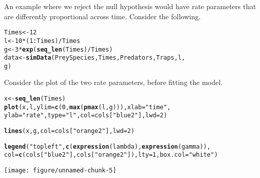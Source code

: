 \documentclass[12pt]{article}\usepackage[]{graphicx}\usepackage[]{color}
\makeatletter
\def\maxwidth{ %
  \ifdim\Gin@nat@width>\linewidth
    \linewidth
  \else
    \Gin@nat@width
  \fi
}
\newcommand{\hlnum}[1]{\textcolor[rgb]{0.686,0.059,0.569}{#1}}%
\newcommand{\hlstr}[1]{\textcolor[rgb]{0.192,0.494,0.8}{#1}}%
\newcommand{\hlopt}[1]{\textcolor[rgb]{0,0,0}{#1}}%
\newcommand{\hlstd}[1]{\textcolor[rgb]{0.345,0.345,0.345}{#1}}%
\newcommand{\hlkwb}[1]{\textcolor[rgb]{0.69,0.353,0.396}{#1}}%
\newcommand{\hlkwc}[1]{\textcolor[rgb]{0.333,0.667,0.333}{#1}}%
\newcommand{\hlkwd}[1]{\textcolor[rgb]{0.737,0.353,0.396}{\textbf{#1}}}%
\newenvironment{kframe}{%
 \def\at@end@of@kframe{}%
 \ifinner\ifhmode%
  \def\at@end@of@kframe{\end{minipage}}%
  \begin{minipage}{\columnwidth}%
 \fi\fi%
 \def\FrameCommand##1{\hskip\@totalleftmargin \hskip-\fboxsep
 \colorbox{shadecolor}{##1}\hskip-\fboxsep
     \hskip-\linewidth \hskip-\@totalleftmargin \hskip\columnwidth}%
 \MakeFramed {\advance\hsize-\width
   \@totalleftmargin\z@ \linewidth\hsize
   \@setminipage}}%
 {\par\unskip\endMakeFramed%
 \at@end@of@kframe}
\newenvironment{knitrout}{}{} %
\makeatother
\begin{document}
An example where we reject the null hypothesis would have rate parameters that are differently proportional across time.  Consider the following.

\begin{knitrout}
\color{fgcolor}\begin{kframe}
\begin{alltt}
\hlstd{Times} \hlkwb{<-} \hlnum{12}
\hlstd{l} \hlkwb{<-} \hlnum{10} \hlopt{*} \hlstd{(}\hlnum{1}\hlopt{:}\hlstd{Times)}\hlopt{/}\hlstd{Times}
\hlstd{g} \hlkwb{<-} \hlnum{3} \hlopt{*} \hlkwd{exp}\hlstd{(}\hlkwd{seq_len}\hlstd{(Times)}\hlopt{/}\hlstd{Times)}
\hlstd{data} \hlkwb{<-} \hlkwd{simData}\hlstd{(PreySpecies, Times, Predators, Traps, l,}
    \hlstd{g)}
\end{alltt}


{\ttfamily\noindent\bfseries{}}\end{kframe}
\end{knitrout}


Consider the plot of the two rate parameters, before fitting the model.  
\begin{knitrout}
\color{fgcolor}\begin{kframe}
\begin{alltt}
\hlstd{x} \hlkwb{<-} \hlkwd{seq_len}\hlstd{(Times)}
\hlkwd{plot}\hlstd{(x, l,} \hlkwc{ylim} \hlstd{=} \hlkwd{c}\hlstd{(}\hlnum{0}\hlstd{,} \hlkwd{max}\hlstd{(}\hlkwd{pmax}\hlstd{(l, g))),} \hlkwc{xlab} \hlstd{=} \hlstr{"time"}\hlstd{,}
    \hlkwc{ylab} \hlstd{=} \hlstr{"rate"}\hlstd{,} \hlkwc{type} \hlstd{=} \hlstr{"l"}\hlstd{,} \hlkwc{col} \hlstd{= cols[}\hlstr{"blue2"}\hlstd{],} \hlkwc{lwd} \hlstd{=} \hlnum{2}\hlstd{)}
\end{alltt}


{\ttfamily\noindent\bfseries\color{errorcolor}{Error: object 'cols' not found}}\begin{alltt}
\hlkwd{lines}\hlstd{(x, g,} \hlkwc{col} \hlstd{= cols[}\hlstr{"orange2"}\hlstd{],} \hlkwc{lwd} \hlstd{=} \hlnum{2}\hlstd{)}
\end{alltt}


{\ttfamily\noindent\bfseries\color{errorcolor}{Error: object 'cols' not found}}\begin{alltt}
\hlkwd{legend}\hlstd{(}\hlstr{"topleft"}\hlstd{,} \hlkwd{c}\hlstd{(}\hlkwd{expression}\hlstd{(lambda),} \hlkwd{expression}\hlstd{(gamma)),}
    \hlkwc{col} \hlstd{=} \hlkwd{c}\hlstd{(cols[}\hlstr{"blue2"}\hlstd{], cols[}\hlstr{"orange2"}\hlstd{]),} \hlkwc{lty} \hlstd{=} \hlnum{1}\hlstd{,} \hlkwc{box.col} \hlstd{=} \hlstr{"white"}\hlstd{)}
\end{alltt}


{\ttfamily\noindent\bfseries\color{errorcolor}{Error: object 'cols' not found}}\end{kframe}

{\centering \texttt{[image: figure/unnamed-chunk-5]} 

}



\end{knitrout}
\end{document}
